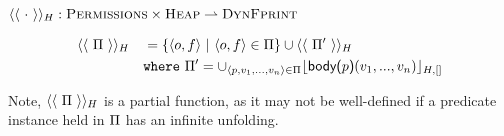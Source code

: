 \documentclass {llncs}
\begin{document}
%

\noindent $\erasurePerm{\cdot}: \setDFootprintIso \times \setHeap \rightharpoonup \setDFootprintEqui$

  \begin{scenter}
        \begin{alignat*}{2}
        	    & \erasurePerm{\perm}
            &&= \{ \langle{o}, {f}\rangle ~\vert~ \langle{o}, {f}\rangle \in \perm \} \cup \erasurePerm{\perm'} \\
            &&& \mathtt{where~} \perm' = \cup_{\langle p, v_1, ... , v_n \rangle \in \perm} \dynamicFP {H} {[]} {\body{p}(v_1, ..., v_n)} \\
        \end{alignat*}
    \end{scenter}

Note, $\erasurePerm{\perm}$ is a partial function, as it may not be well-defined if a predicate instance held in $\perm$ has an infinite unfolding.

\end{document}
